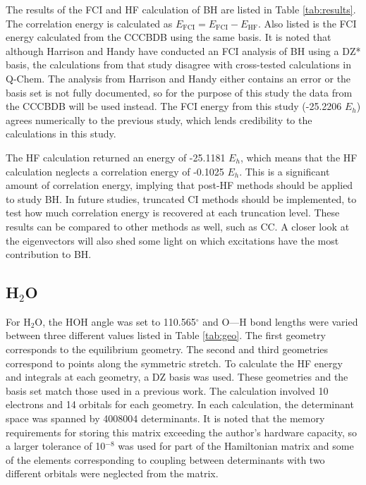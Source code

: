 \documentclass[final,3p,times,twocolumn]{elsarticle}
\begin{document}
The results of the FCI and HF calculation of BH are listed in Table \ref{tab:results}. The correlation energy is calculated as $E_{\text{FCI}} = E_{\text{FCI}} - E_{\text{HF}}$. Also listed is the FCI energy calculated from the CCCBDB using the same basis.\cite{cccbdb} It is noted that although Harrison and Handy have conducted an FCI analysis of BH using a DZ* basis,\cite{handy-1983} the calculations from that study disagree with cross-tested calculations in Q-Chem. The analysis from Harrison and Handy either contains an error or the basis set is not fully documented, so for the purpose of this study the data from the CCCBDB will be used instead. The FCI energy from this study (-25.2206 $E_h$) agrees numerically to the previous study, which lends credibility to the calculations in this study. %


The HF calculation returned an energy of -25.1181 $E_h$, which means that the HF calculation neglects a correlation energy of -0.1025 $E_h$. This is a significant amount of correlation energy, implying that post-HF methods should be applied to study BH. In future studies, truncated CI methods should be implemented, to test how much correlation energy is recovered at each truncation level. These results can be compared to other methods as well, such as CC. A closer look at the eigenvectors will also shed some light on which excitations have the most contribution to BH.


\subsection{H$_2$O} \label{sec:h2oresults}

For H$_2$O, the HOH angle was set to 110.565$^\circ$ and O---H bond lengths were varied between three different values listed in Table \ref{tab:geo}. The first geometry corresponds to the equilibrium geometry. The second and third geometries correspond to points along the symmetric stretch. To calculate the HF energy and integrals at each geometry, a DZ basis was used.\cite{dunning} These geometries and the basis set match those used in a previous work.\cite{handy-1983} The calculation involved 10 electrons and 14 orbitals for each geometry. In each calculation, the determinant space was spanned by 4008004 determinants. It is noted that the memory requirements for storing this matrix exceeding the author's hardware capacity, so a larger tolerance of 10$^{-8}$ was used for part of the Hamiltonian matrix and some of the elements corresponding to coupling between determinants with two different orbitals were neglected from the matrix.
\end{document}
